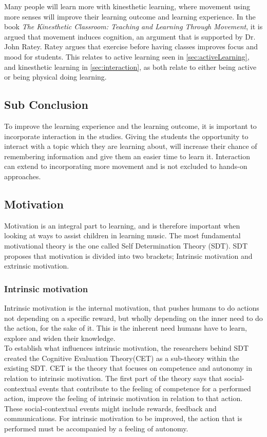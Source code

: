 Many people will learn more with kinesthetic learning, where movement using more senses will improve their learning outcome and learning experience\cite{kinest}. In the book \textit{The Kinesthetic Classroom: Teaching and Learning Through Movement}\cite{kinestheticMovement}, it is argued that movement induces cognition, an argument that is supported by Dr. John Ratey\cite{rateySpark}. Ratey argues that exercise before having classes improves focus and mood for students\cite[p.~33]{rateySpark}. This relates to active learning seen in \autoref{sec:activeLearning}, and kinesthetic learning in \autoref{sec:interaction}, as both relate to either being active or being physical doing learning.

\subsection*{Sub Conclusion}
To improve the learning experience and the learning outcome, it is important to incorporate interaction in the studies. Giving the students the opportunity to interact with a topic which they are learning about, will increase their chance of remembering information and give them an easier time to learn it. Interaction can extend to incorporating more movement and is not excluded to hands-on approaches.

\subsection{Motivation}
Motivation is an integral part to learning, and is therefore important when looking at ways to assist children in learning music\cite{motivationGameDesign}. The most fundamental motivational theory is the one called Self Determination Theory (SDT)\cite{SDT}. SDT proposes that motivation is divided into two brackets; Intrinsic motivation and extrinsic motivation\cite{SDT}. 

\subsubsection*{Intrinsic motivation}\label{sec:intrinsic}
Intrinsic motivation is the internal motivation, that pushes humans to do actions not depending on a specific reward, but wholly depending on the inner need to do the action, for the sake of it.
This is the inherent need humans have to learn, explore and widen their knowledge\cite{SDT}.\\

To establish what influences intrinsic motivation, the researchers behind SDT created the Cognitive Evaluation Theory(CET) as a sub-theory within the existing SDT\cite{SDT}. CET is the theory that focuses on competence and autonomy in relation to intrinsic motivation. The first part of the theory says that social-contextual events that contribute to the feeling of competence for a performed action, improve the feeling of intrinsic motivation in relation to that action\cite[p.~70]{SDT}. These social-contextual events might include rewards, feedback and communications\cite[p.~70]{SDT}. For intrinsic motivation to be improved, the action that is performed must be accompanied by a feeling of autonomy\cite[p.~70]{SDT}.


